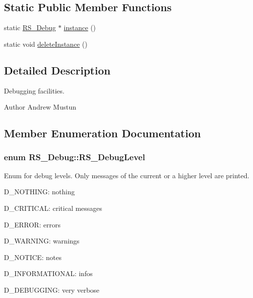\subsection*{Static Public Member Functions}
\begin{DoxyCompactItemize}
\item 
static \hyperlink{classRS__Debug}{R\-S\-\_\-\-Debug} $\ast$ \hyperlink{classRS__Debug_a1e1b40ef1d1ea5debef90d3a4082a1cd}{instance} ()
\item 
static void \hyperlink{classRS__Debug_a2681400f1d6af6f854aa46d8f83bc48a}{delete\-Instance} ()
\end{DoxyCompactItemize}


\subsection{Detailed Description}
Debugging facilities.

\begin{DoxyAuthor}{Author}
Andrew Mustun 
\end{DoxyAuthor}


\subsection{Member Enumeration Documentation}
\hypertarget{classRS__Debug_af13c679a07ad1548ce7624cb9a38d347}{
\subsubsection[{R\-S\-\_\-\-Debug\-Level}]{\setlength{\rightskip}{0pt plus 5cm}enum {\bf R\-S\-\_\-\-Debug\-::\-R\-S\-\_\-\-Debug\-Level}}}\label{classRS__Debug_af13c679a07ad1548ce7624cb9a38d347}
Enum for debug levels. Only messages of the current or a higher level are printed. 
\begin{DoxyItemize}
\item D\-\_\-\-N\-O\-T\-H\-I\-N\-G\-: nothing 
\item D\-\_\-\-C\-R\-I\-T\-I\-C\-A\-L\-: critical messages 
\item D\-\_\-\-E\-R\-R\-O\-R\-: errors 
\item D\-\_\-\-W\-A\-R\-N\-I\-N\-G\-: warnings 
\item D\-\_\-\-N\-O\-T\-I\-C\-E\-: notes 
\item D\-\_\-\-I\-N\-F\-O\-R\-M\-A\-T\-I\-O\-N\-A\-L\-: infos 
\item D\-\_\-\-D\-E\-B\-U\-G\-G\-I\-N\-G\-: very verbose 
\end{DoxyItemize}

